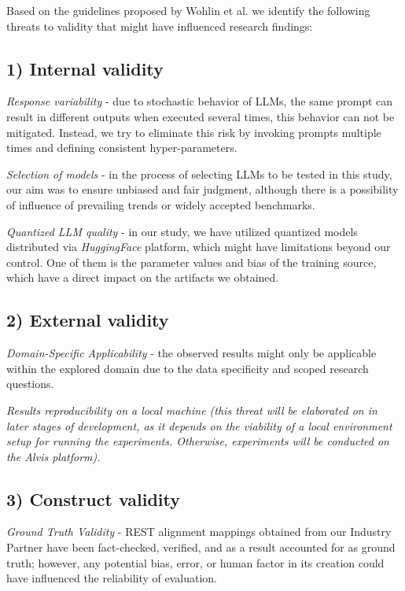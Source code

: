 \documentclass[conference]{IEEEtran}
\begin{document}
Based on the guidelines proposed by Wohlin et al. \cite{wohlin2012experimentation} we identify the following threats to validity that might have influenced research findings: 
\subsection*{\textbf{1) Internal validity}}
    \textit{Response variability }- due to stochastic behavior of LLMs, the same prompt can result in different outputs when executed several times, this behavior can not be mitigated. Instead, we try to eliminate this risk by invoking prompts multiple times and defining consistent hyper-parameters.
    
    \textit{Selection of models} - in the process of selecting LLMs to be tested in this study, our aim was to ensure unbiased and fair judgment, although there is a possibility of influence of prevailing trends or widely accepted benchmarks.
    
    \textit{Quantized LLM quality} - in our study, we have utilized quantized models distributed via \textit{HuggingFace} platform, which might have limitations beyond our control. One of them is the parameter values and bias of the training source, which have a direct impact on the artifacts we obtained.

\subsection*{\textbf{2) External validity}}
    
    \textit{Domain-Specific Applicability} - the observed results might only be applicable within the explored domain due to the data specificity and scoped research questions.
    
    \textit{Results reproducibility on a local machine (this threat will be elaborated on in later stages of development, as it depends on the viability of a local environment setup for running the experiments. Otherwise, experiments will be conducted on the Alvis platform).}

\subsection*{\textbf{3) Construct validity}}
\textit{Ground Truth Validity} - REST alignment mappings obtained from our Industry Partner have been fact-checked, verified, and as a result accounted for as ground truth; however, any potential bias, error, or human factor in its creation could have influenced the reliability of evaluation.
\end{document}
